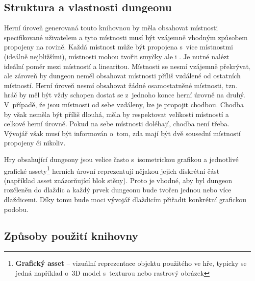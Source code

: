 
\subsection{Struktura a vlastnosti dungeonu}


Herní úroveň generovaná touto knihovnou by měla obsahovat místnosti specifikované uživatelem a tyto místnosti musí být vzájemně vhodným způsobem propojeny na rovině.
Každá místnost může být propojena s~více místnostmi (ideálně nejbližšími), místnosti mohou tvořit smyčky ale i .
Je nutné nalézt ideální poměr mezi  místností a linearitou.
Místnosti se nesmí vzájemně překrývat, ale zároveň by dungeon neměl obsahovat místnosti příliš vzdálené od ostatních místností.
Herní úroveň nesmí obsahovat žádné osamostatněné místnosti, tzn. hráč by měl být vždy schopen dostat se z~jednoho konce herní úrovně na druhý.
V~případě, že jsou místnosti od sebe vzdáleny, lze je propojit chodbou.
Chodba by však neměla být příliš dlouhá, měla by respektovat velikosti místností a celkové herní úrovně.
Pokud na sebe místnosti doléhají, chodba není třeba.
Vývojář však musí být informován o~tom, zda mají být dvě sousední místností propojeny či nikoliv.
\par
Hry obsahující dungeony jsou velice často s~isometrickou grafikou a jednotlivé grafické assety\footnote{\textbf{Grafický asset} -- vizuální reprezentace objektu použitého ve hře, typicky se jedná například o~3D model s~texturou nebo rastrový obrázek} herních úrovní reprezentují nějakou jejich diskrétní část (například asset znázorňující blok stěny).
Proto je vhodné, aby byl dungeon rozčleněn do dlaždic a každý prvek dungeonu bude tvořen jednou nebo více dlaždicemi.
Díky tomu bude moci vývojář dlaždicím přiřadit konkrétní grafickou podobu.


\subsection{Způsoby použití knihovny}


